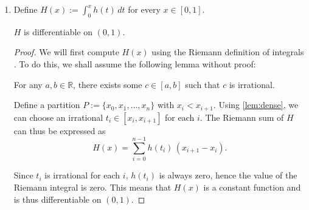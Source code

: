 \begin{enumerate}
\begin{enumerate}
\begin{enumerate}
                        \begin{proof}
                            From \cref{prop:1di}, the function $h(x)$ is continuous for all $x \in [0, 1] \, \backslash \, \mathbb{Q}$. It is also given that $\mathbb{Q}$ is countable. But \cref{prop:1a} states that every countable subset of $\mathbb{R}$ has measure zero, hence $\mathbb{Q}$ has measure zero. It follows that $h$ is continuous almost everywhere on $[0, 1]$, and by \cref{thm:lebesgue}, is Riemann-integrable on that interval.
                        \end{proof}

                        \bigskip

                    \item Define $H(x) := \int_0^x h(t) \, dt$ for every $x \in [0, 1]$.

                        \medskip

                        \begin{proposition} \label{prop:1diii}
                            $H$ is differentiable on $(0, 1)$.
                        \end{proposition}

                        \begin{proof}
                            We will first compute $H(x)$ using the Riemann definition of integrals \parencite{riemann-integral}. To do this, we shall assume the following lemma without proof:

                            \smallskip

                            \begin{lemma} \label{lem:dense}
                                For any $a, b \in \mathbb{R}$, there exists some $c \in [a, b]$ such that $c$ is irrational.
                            \end{lemma}

                            \smallskip

                            Define a partition $P := \{x_0, x_1, \ldots, x_n\}$ with $x_i < x_{i + 1}$.
                            Using \cref{lem:dense}, we can choose an irrational $t_i \in [x_i, x_{i + 1}]$ for each $i$.
                            The Riemann sum of $H$ can thus be expressed as
                            \[
                                H(x) = \sum_{i = 0}^{n - 1} h(t_i) \, (x_{i + 1} - x_i).
                            \]

                            Since $t_i$ is irrational for each $i$, $h(t_i)$ is always zero, hence the value of the Riemann integral is zero.
                            This means that $H(x)$ is a constant function and is thus differentiable on $(0, 1)$.
                        \end{proof}


\end{enumerate}
\end{enumerate}
\end{enumerate}
